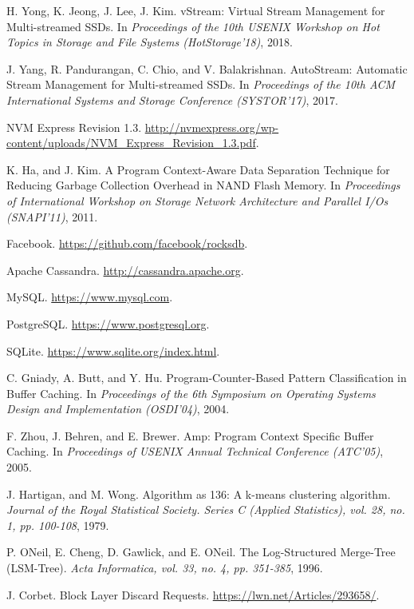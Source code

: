 \begin{thebibliography}{00}
H. Yong, K. Jeong, J. Lee, J. Kim.
vStream: Virtual Stream Management for Multi-streamed SSDs.
In \textit{Proceedings of the 10th USENIX Workshop on Hot Topics in Storage
and File Systems (HotStorage'18)}, 2018.

J. Yang, R. Pandurangan, C. Chio, and V. Balakrishnan.
AutoStream: Automatic Stream Management for Multi-streamed SSDs.
In \textit{Proceedings of the 10th ACM International Systems and Storage Conference (SYSTOR'17)}, 2017.

NVM Express Revision 1.3.
\url{http://nvmexpress.org/wp-content/uploads/NVM_Express_Revision_1.3.pdf}.

K. Ha, and J. Kim.
A Program Context-Aware Data Separation Technique for Reducing Garbage Collection Overhead in NAND Flash Memory.
In \textit{Proceedings of International Workshop on Storage Network Architecture 
and Parallel I/Os (SNAPI'11)}, 2011.

Facebook. 
\url{https://github.com/facebook/rocksdb}.

Apache Cassandra. 
\url{http://cassandra.apache.org}.

MySQL.
\url{https://www.mysql.com}.

PostgreSQL.
\url{https://www.postgresql.org}.

SQLite.
\url{https://www.sqlite.org/index.html}.

C. Gniady, A. Butt, and Y. Hu.
Program-Counter-Based Pattern Classification in Buffer Caching.
In \textit{Proceedings of the 6th Symposium on Operating Systems Design and Implementation (OSDI'04)}, 2004.

F. Zhou, J. Behren, and E. Brewer.
Amp: Program Context Specific Buffer Caching.
In \textit{Proceedings of USENIX Annual Technical Conference (ATC'05)}, 2005.

J. Hartigan, and M. Wong.
Algorithm as 136: A k-means clustering algorithm.
\textit{Journal of the Royal Statistical Society. Series C (Applied Statistics),
vol. 28, no. 1, pp. 100-108}, 1979.

P. ONeil, E. Cheng, D. Gawlick, and E. ONeil.
The Log-Structured Merge-Tree (LSM-Tree).
\textit{Acta Informatica, vol. 33, no. 4, pp. 351-385}, 1996.

J. Corbet.
Block Layer Discard Requests.
\url{https://lwn.net/Articles/293658/}.


\end{thebibliography}
